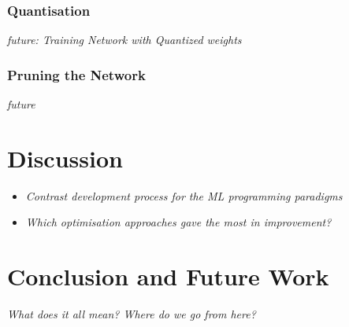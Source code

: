 \subsection{Quantisation}
\textit{future: Training Network with Quantized weights}

\subsection{Pruning the Network}
\textit{future}

\chapter{Discussion}
\begin{itemize}
	\item \textit{Contrast development process for the ML programming paradigms}
	\item \textit{Which optimisation approaches gave the most in improvement?}
\end{itemize}

\chapter{Conclusion and Future Work}
\textit{What does it all mean? Where do we go from here?}

